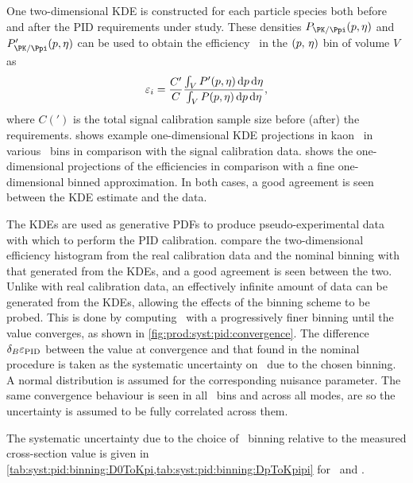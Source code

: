 One two-dimensional \ac{KDE} is constructed for each particle species both 
before and after the \ac{PID} requirements under study.
These densities $P_{\PK/\Ppi}(\ptot, \Eta)$ and $P'_{\PK/\Ppi}(\ptot, \Eta)$
can be used to obtain the efficiency \effi\ in the $(p,\,\eta)$ bin of 
volume $V$ as
\begin{equation}
  \effi = \frac{C'}{C}\frac{%
    \int_{V} P'(\ptot,\Eta)\dif{p}\dif{\Eta}
  }{%
    \int_{V} P(\ptot,\Eta)\dif{p}\dif{\Eta}
  },
\end{equation}
where $C(')$ is the total signal calibration sample size before (after) the 
requirements.
 shows example one-dimensional \ac{KDE} 
projections in kaon \Eta\ in various \ptot\ bins in comparison with the signal 
calibration data.
 shows the one-dimensional projections 
of the efficiencies in comparison with a fine one-dimensional binned 
approximation.
In both cases, a good agreement is seen between the \ac{KDE} estimate and the 
data.

The \acp{KDE} are used as generative \acp{PDF} to produce pseudo-experimental 
data with which to perform the \ac{PID} calibration.
compare the two-dimensional efficiency histogram from the real calibration data 
and the nominal binning with that generated from the \acp{KDE}, and a good 
agreement is seen between the two.
Unlike with real calibration data, an effectively infinite amount of data can 
be generated from the \acp{KDE}, allowing the effects of the binning scheme to 
be probed.
This is done by computing \effpid\ with a progressively finer binning until the 
value converges, as shown in \cref{fig:prod:syst:pid:convergence}.
The difference $\delta_{B}{\varepsilon_{\textnormal{PID}}}$ between the value at convergence and that 
found in the nominal procedure is taken as the systematic uncertainty on 
\effpid\ due to the chosen binning.
A normal distribution is assumed for the corresponding nuisance parameter.
The same convergence behaviour is seen in all \pTy\ bins and across all modes, 
are so the uncertainty is assumed to be fully correlated across them.

The systematic uncertainty due to the choice of \ptotetanspd\ binning relative 
to the measured cross-section value is given in 
\cref{tab:syst:pid:binning:D0ToKpi,tab:syst:pid:binning:DpToKpipi} for 
\DzToKpi\ and \DpToKpipi.

